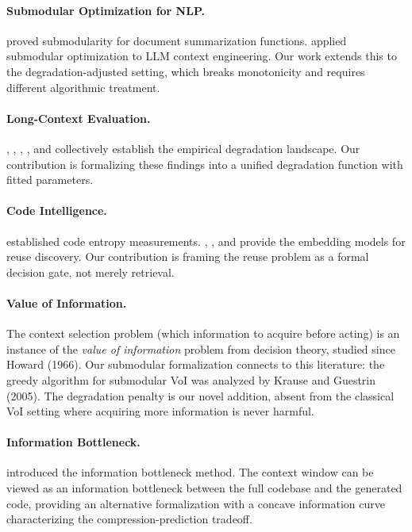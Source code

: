 \documentclass[11pt, a4paper, copyright]{googledeepmind}
\begin{document}
\paragraph{Submodular Optimization for NLP.} \citet{lin2011submodular} proved submodularity for document summarization functions. \citet{jina2025submodular} applied submodular optimization to LLM context engineering. Our work extends this to the degradation-adjusted setting, which breaks monotonicity and requires different algorithmic treatment.

\paragraph{Long-Context Evaluation.} \citet{liu2024lost}, \citet{chroma2025contextrot}, \citet{du2025context}, \citet{kuratov2024babilong}, and \citet{hsieh2024ruler} collectively establish the empirical degradation landscape. Our contribution is formalizing these findings into a unified degradation function with fitted parameters.

\paragraph{Code Intelligence.} \citet{hindle2012naturalness} established code entropy measurements. \citet{feng2020codebert}, \citet{guo2022unixcoder}, and \citet{wang2023codet5plus} provide the embedding models for reuse discovery. Our contribution is framing the reuse problem as a formal decision gate, not merely retrieval.

\paragraph{Value of Information.} The context selection problem (which information to acquire before acting) is an instance of the \emph{value of information} problem from decision theory, studied since Howard (1966). Our submodular formalization connects to this literature: the greedy algorithm for submodular VoI was analyzed by Krause and Guestrin (2005). The degradation penalty is our novel addition, absent from the classical VoI setting where acquiring more information is never harmful.

\paragraph{Information Bottleneck.} \citet{tishby2000information} introduced the information bottleneck method. The context window can be viewed as an information bottleneck between the full codebase and the generated code, providing an alternative formalization with a concave information curve characterizing the compression-prediction tradeoff.
\end{document}
